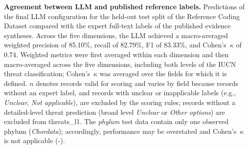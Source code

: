 \begin{table}[H]
\caption{\textbf{Agreement between LLM and published reference labels.} Predictions of the final LLM configuration for the held-out test split of the Reference Coding Dataset compared with the expert full-text labels of the published evidence syntheses. Across the five dimensions, the LLM achieved a macro-averaged weighted precision of 85.10\%, recall of 82.79\%, F1 of 83.33\%, and Cohen's~$\kappa$ of 0.74. Weighted metrics were first averaged within each dimension and then macro-averaged across the five dimensions, including both levels of the IUCN threat classification; Cohen's~$\kappa$ was averaged over the fields for which it is defined. $n$ denotes records valid for scoring and varies by field because records without an expert label, and records with unclear or inapplicable labels (e.g., \textit{Unclear}, \textit{Not applicable}), are excluded by the scoring rules; records without a detailed-level threat prediction (broad level \textit{Unclear} or \textit{Other options}) are excluded from threats\_l1. The \textit{phylum} test data contain only one observed phylum (\textit{Chordata}); accordingly, performance may be overstated and Cohen's~$\kappa$ is not applicable (-).}
\label{tab:cc2_coding}
\end{table}
